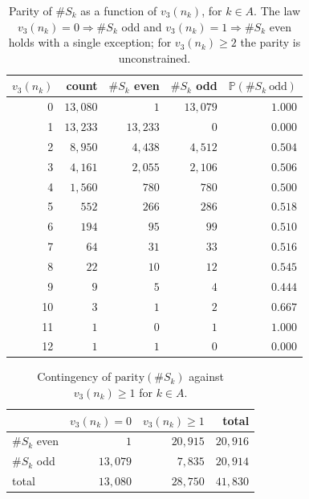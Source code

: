 \documentclass[12pt]{amsart}%
\newcommand{\1}{\mathds{1}}
\theoremstyle{definition}
\numberwithin{equation}{section}
\numberwithin{table}{section}
\numberwithin{figure}{section}
\begin{document}
\begin{table}[ht]
  \centering
  \begin{tabular}{rrrrr}
    \toprule
    $v_3(n_k)$ & count & $\#S_k$ even & $\#S_k$ odd & $\mathbb{P}(\#S_k\ \mathrm{odd})$ \\
    \midrule
    0 & $13{,}080$ & $1$ & $13{,}079$ & $1.000$ \\
    1 & $13{,}233$ & $13{,}233$ & $0$ & $0.000$ \\
    2 & $8{,}950$ & $4{,}438$ & $4{,}512$ & $0.504$ \\
    3 & $4{,}161$ & $2{,}055$ & $2{,}106$ & $0.506$ \\
    4 & $1{,}560$ & $780$ & $780$ & $0.500$ \\
    5 & $552$ & $266$ & $286$ & $0.518$ \\
    6 & $194$ & $95$ & $99$ & $0.510$ \\
    7 & $64$ & $31$ & $33$ & $0.516$ \\
    8 & $22$ & $10$ & $12$ & $0.545$ \\
    9 & $9$ & $5$ & $4$ & $0.444$ \\
    10 & $3$ & $1$ & $2$ & $0.667$ \\
    11 & $1$ & $0$ & $1$ & $1.000$ \\
    12 & $1$ & $1$ & $0$ & $0.000$ \\
    \bottomrule
  \end{tabular}
    \caption{Parity of $\#S_k$ as a function of $v_3(n_k)$, for $k \in A$. The law $v_3(n_k)=0\Rightarrow\#S_k$ odd and $v_3(n_k)=1\Rightarrow\#S_k$ even holds with a single exception; for $v_3(n_k)\ge2$ the parity is unconstrained.}
        \label{tab:parity-law}
\end{table}

\begin{table}[ht]
  \centering
  \begin{tabular}{lrrr}
    \toprule
               & $v_3(n_k) = 0 $ & $v_3(n_k) \geq 1 $ & total \\
    \midrule
    $\#S_k$ even  & $1$ & $20{,}915$ & $20{,}916$ \\
    $\#S_k$ odd   & $13{,}079$ & $7{,}835$ & $20{,}914$ \\
    \midrule
    total       & $13{,}080$ & $28{,}750$ & $41{,}830$ \\
    \bottomrule
  \end{tabular}
    \caption{Contingency of $\mathrm{parity}(\#S_k)$ against $v_3(n_k) \geq 1$ for $k \in  A$.}
  \label{tab:law-contingency}

\end{table}
\end{document}
